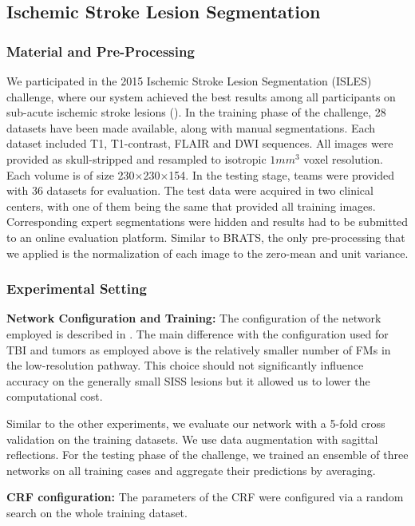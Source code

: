 \documentclass[preprint,authoryear,12pt]{elsarticle}
\begin{document}
\subsection{Ischemic Stroke Lesion Segmentation}
\label{subsec:evalIsles}

\subsubsection{Material and Pre-Processing}

We participated in the 2015 Ischemic Stroke Lesion Segmentation (ISLES) challenge, where our system achieved the best results among all participants on sub-acute ischemic stroke lesions (\cite{maier2017isles}). In the training phase of the challenge, 28 datasets have been made available, along with manual segmentations. Each dataset included T1, T1-contrast, FLAIR and DWI sequences. All images were provided as skull-stripped and resampled to isotropic $1mm^3$ voxel resolution. Each volume is of size 230$\times$230$\times$154. In the testing stage, teams were provided with 36 datasets for evaluation. The test data were acquired in two clinical centers, with one of them being the same that provided all training images. Corresponding expert segmentations were hidden and results had to be submitted to an online evaluation platform. Similar to BRATS, the only pre-processing that we applied is the normalization of each image to the zero-mean and unit variance.

\subsubsection{Experimental Setting}

\textbf{Network Configuration and Training:} The configuration of the network employed is described in \cite{kamnitsas2015Isles}. The main difference with the configuration used for TBI and tumors as employed above is the relatively smaller number of FMs in the low-resolution pathway. This choice should not significantly influence accuracy on the generally small SISS lesions but it allowed us to lower the computational cost.

Similar to the other experiments, we evaluate our network with a 5-fold cross validation on the training datasets. We use data augmentation with sagittal reflections. For the testing phase of the challenge, we trained an ensemble of three networks on all training cases and aggregate their predictions by averaging.

\textbf{CRF configuration:} The parameters of the CRF were configured via a random search on the whole training dataset.
\end{document}
